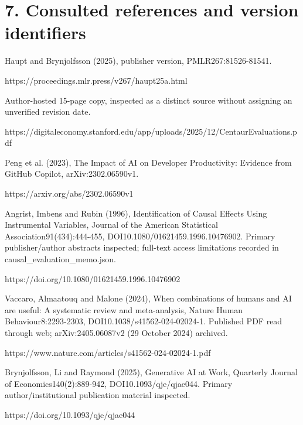 \documentclass[10pt]{article}
\begin{document}
\section*{7. Consulted references and version identifiers}
Haupt and Brynjolfsson (2025), publisher version, PMLR267:81526-81541.\par
https://proceedings.mlr.press/v267/haupt25a.html\par
Author-hosted 15-page copy, inspected as a distinct source without assigning an unverified revision date.\par
https://digitaleconomy.stanford.edu/app/uploads/2025/12/CentaurEvaluations.pdf\par
Peng et al. (2023), The Impact of AI on Developer Productivity: Evidence from GitHub Copilot, arXiv:2302.06590v1.\par
https://arxiv.org/abs/2302.06590v1\par
Angrist, Imbens and Rubin (1996), Identification of Causal Effects Using Instrumental Variables, Journal of the American Statistical Association91(434):444-455, DOI10.1080/01621459.1996.10476902. Primary publisher/author abstracts inspected; full-text access limitations recorded in causal\_evaluation\_memo.json.\par
https://doi.org/10.1080/01621459.1996.10476902\par
Vaccaro, Almaatouq and Malone (2024), When combinations of humans and AI are useful: A systematic review and meta-analysis, Nature Human Behaviour8:2293-2303, DOI10.1038/s41562-024-02024-1. Published PDF read through web; arXiv:2405.06087v2 (29 October 2024) archived.\par
https://www.nature.com/articles/s41562-024-02024-1.pdf\par
Brynjolfsson, Li and Raymond (2025), Generative AI at Work, Quarterly Journal of Economics140(2):889-942, DOI10.1093/qje/qjae044. Primary author/institutional publication material inspected.\par
https://doi.org/10.1093/qje/qjae044\par
\end{document}
